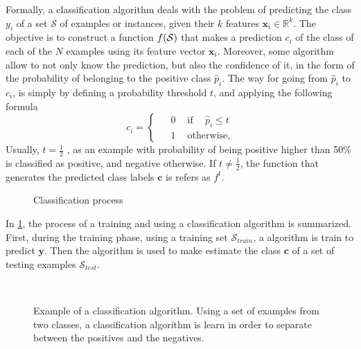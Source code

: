 Formally, a classification algorithm deals with the problem	of predicting the class $y_i$ of a 
set $\mathcal{S}$ of examples or instances, given their $k$ features \mbox{$\mathbf{x}_i \in 
\mathbb{R}^k$}. The objective is to construct a function $f(\cal{S})$ that makes a prediction 
$c_i$ of the class of each of the $N$ examples using its feature vector $\mathbf{x}_i$.
\label{ntn:ch2:1}
Moreover, some algorithm allow to not only know the prediction, but also the confidence of it, in 
the form of the probability of belonging to the positive class $\hat p_i$. The way for going from 
$\hat p_i$ to $c_i$, is simply by defining a probability threshold $t$, and applying the following 
formula
\begin{equation}\label{eq_pred}
  c_i = 
  \begin{cases}
    \phantom{-}0 \phantom{-} \mbox{if} \phantom{-} \hat p_i \le t\\
    \phantom{-}1 \phantom{-}\mbox{otherwise,}
  \end{cases}
\end{equation}
Usually, $t=\frac{1}{2}$ \citep{Hastie2009}, as an example with probability of being positive 
higher than 50\% is classified as positive, and negative otherwise. If $t \ne \frac{1}{2}$, the 
function that generates the predicted class labels $\mathbf{c}$ is refers as $f^t$.

\begin{figure}
	\centering
	
  \caption{Classification process}
  \label{fig:2:1}
\end{figure}

In \figurename{ \ref{fig:2:1}}, the process of a training and using a classification algorithm is 
summarized. First, during the training phase, using a training set $\mathcal{S}_{train}$, a 
algorithm is train to predict $\mathbf{y}$. Then the algorithm is used to make estimate the class 
$\mathbf{c}$ of a set of testing examples $\mathcal{S}_{test}$.

\begin{figure}[!t]
\centering
{}
\\
\caption{Example of a classification algorithm. Using a set of examples from two classes, a 
	classification algorithm is learn in order to separate between the positives and the negatives. }
\label{fig:2:2}
\end{figure} 

